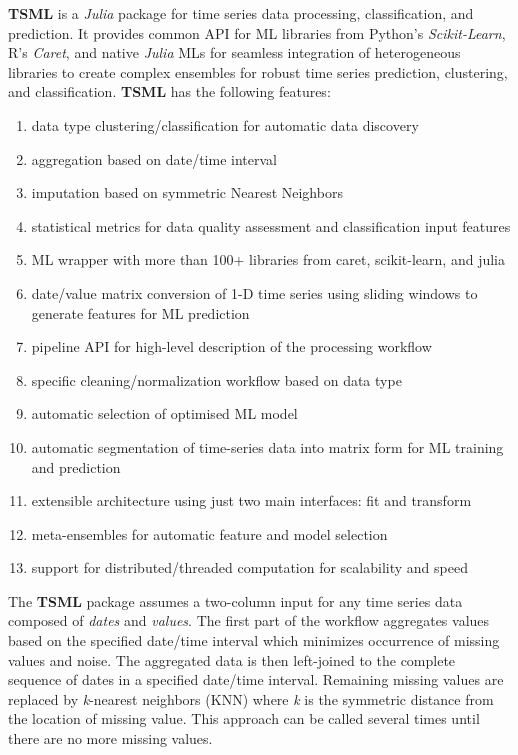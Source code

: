 \documentclass{juliacon}
\begin{document}
\textbf{TSML}\cite{tsml2019} is a \emph{Julia}\cite{bezanson2017julia} package for time series data processing, classification, and prediction. 
It provides common API for ML libraries from Python's \emph{Scikit-Learn}, 
R's \emph{Caret}, and native \emph{Julia} MLs for seamless integration of heterogeneous 
libraries to create complex ensembles for robust time series prediction, clustering, and classification.
\textbf{TSML} has the following features:
\begin{enumerate}
\item data type clustering/classification for automatic data discovery
\item aggregation based on date/time interval
\item imputation based on symmetric Nearest Neighbors
\item statistical metrics for data quality assessment and classification input features
\item ML wrapper with more than 100+ libraries from caret, scikit-learn, and julia
\item date/value matrix conversion of 1-D time series using sliding windows to generate features for ML prediction
\item pipeline API for high-level description of the processing workflow
\item specific cleaning/normalization workflow based on data type
\item automatic selection of optimised ML model
\item automatic segmentation of time-series data into matrix form for ML training and prediction 
\item extensible architecture using just two main interfaces: fit and transform
\item meta-ensembles for automatic feature and model selection
\item support for distributed/threaded computation for scalability and speed
\end{enumerate}

The \textbf{TSML} package assumes a two-column input for any time series data composed of \emph{dates} and \emph{values}. The first part of the workflow aggregates values based on the specified date/time interval which minimizes occurrence of missing values and noise. The aggregated data is then left-joined to the complete sequence of dates in a specified date/time interval. Remaining missing values are replaced by \textit{k}-nearest neighbors (KNN) where \textit{k} is the symmetric distance from the location of missing value. This approach can be called several times until there are no more missing values.
\end{document}
